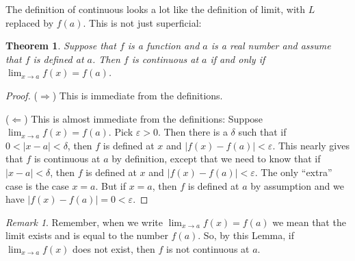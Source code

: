\documentclass[12pt]{amsart}
\def\d{\delta}
\def\e{\varepsilon}
\newcommand{\Q}{\mathbb{Q}}
\newcommand{\R}{{\mathbb{R}}}
\numberwithin{equation}{section}
\theoremstyle{plain} %
\newtheorem{thm}[equation]{Theorem}
\theoremstyle{definition}
\newtheorem{ex}[equation]{Example}
\theoremstyle{remark}
\newtheorem{rem}[equation]{Remark}
\begin{document}
The definition of continuous looks a lot like the definition of limit, with $L$ replaced by $f(a)$. This is not just superficial:

\begin{thm} \label{thm36}
Suppose that $f$ is a function and $a$ is a real number and assume that $f$ is defined at $a$. Then $f$ is continuous at   $a$ if and only if $\lim_{x \to a} f(x) = f(a)$.
\end{thm}



\begin{proof} ($\Rightarrow$) This is immediate from the definitions.

($\Leftarrow$) This is almost immediate from the definitions: 
Suppose $\lim_{x \to a} f(x) = f(a)$. Pick $\e>0$. Then there is a $\d$ such that if $0 < |x - a| < \d$, then $f$ is defined at $x$ and $|f(x) - f(a)| < \e$. This nearly gives
that $f$ is continuous at $a$ by definition, except that we need to know that if $|x - a| < \d$, then $f$ is defined at $x$ and $|f(x) - f(a)| < \e$. The only ``extra''
case is the case $x = a$. But if $x = a$, then $f$ is defined at $a$ by assumption and we have $|f(x) -f(a)| = 0 < \e$.
\end{proof}


\begin{rem} Remember, when we write $\lim_{x \to a} f(x) = f(a)$ we
  mean that the limit exists and is equal to the number $f(a)$. So, by
  this Lemma, if $\lim_{x \to a} f(x)$ does not exist, then $f$ is not
  continuous at $a$.
\end{rem}






  
\end{document}
